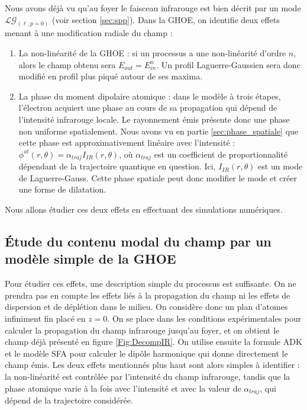 Nous avons déjà vu qu'au foyer le faisceau infrarouge est bien décrit par un mode $\mathcal{LG}_{(\ell,p=0)}$ (voir section \ref{sec:spp}). Dans la GHOE, on identifie deux effets menant à une modification radiale du champ : 
\begin{enumerate}
\item La non-linéarité de la GHOE : si un processus a une non-linéarité d'ordre $n$, alors le champ obtenu sera $E_{out}=E_{in}^n$. Un profil Laguerre-Gaussien sera donc modifié en profil plus piqué autour de ses maxima.

\item La phase du moment dipolaire atomique : dans le modèle à trois étapes, l'électron acquiert une phase au cours de sa propagation qui dépend de l'intensité infrarouge locale. Le rayonnement émis présente donc une phase non uniforme spatialement. Nous avons vu en partie \ref{sec:phase_spatiale} que cette phase est approximativement linéaire avec l'intensité : $\phi^{at}(r,\theta) = \alpha_{traj} I_{IR}(r,\theta)$, où $\alpha_{traj}$ est un coefficient de proportionnalité dépendant de la trajectoire quantique en question. Ici, $I_{IR}(r,\theta)$ est un mode de Laguerre-Gauss. Cette phase spatiale peut donc modifier le mode et créer une forme de dilatation.
\end{enumerate}
Nous allons étudier ces deux effets en effectuant des simulations numériques.

\subsection{\'{E}tude du contenu modal du champ par un modèle simple de la GHOE}
Pour étudier ces effets, une description simple du processus est suffisante. On ne prendra pas en compte les effets liés à la propagation du champ ni les effets de dispersion et de déplétion dans le milieu. On considère donc un plan d'atomes infiniment fin placé en $z=0$. On se place dans les conditions expérimentales pour calculer la propagation du champ infrarouge jusqu'au foyer, et on obtient le champ déjà présenté en figure \ref{Fig:DecompIR}. On utilise ensuite la formule ADK  et le modèle SFA  pour calculer le dipôle harmonique qui donne directement le champ émis. Les deux effets mentionnés plus haut sont alors simples à identifier : la non-linéarité est contrôlée par l'intensité du champ infrarouge, tandis que la phase atomique varie à la fois avec l'intensité et avec la valeur de $\alpha_{traj}$, qui dépend de la trajectoire considérée.

